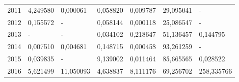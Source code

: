 \begin{table}
\begin{tabular}{p{1cm}p{2cm}p{2cm}p{2cm}p{2cm}p{2cm}p{2cm}}
 2011 &                        4,249580 &             0,000061 &     0,058820 &                   0,009787 &                      29,095041 &                       - \\
 2012 &                        0,155572 &                    - &     0,058144 &                   0,000118 &                      25,086547 &                       - \\
 2013 &                               - &                    - &     0,034102 &                   0,218647 &                      51,136457 &                0,144795 \\
 2014 &                        0,007510 &             0,004681 &     0,148715 &                   0,000458 &                      93,261259 &                       - \\
 2015 &                        0,039835 &                    - &     9,139002 &                   0,011464 &                      85,665565 &                0,028522 \\
 2016 &                        5,621499 &            11,050093 &     4,638837 &                   8,111176 &                      69,256702 &              258,335766 \\
\bottomrule
\end{tabular}
\end{table}
